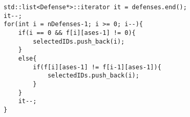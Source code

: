 \begin{lstlisting}
std::list<Defense*>::iterator it = defenses.end();
it--;
for(int i = nDefenses-1; i >= 0; i--){
    if(i == 0 && f[i][ases-1] != 0){
        selectedIDs.push_back(i);
    }
    else{
        if(f[i][ases-1] != f[i-1][ases-1]){
            selectedIDs.push_back(i);
        }
    }
    it--;
}    
\end{lstlisting}
